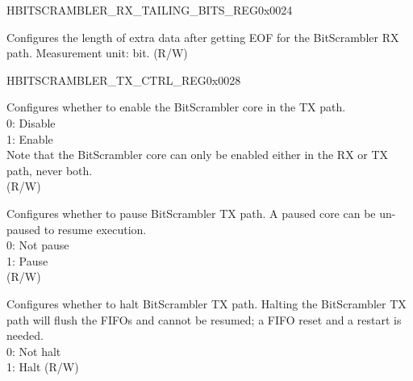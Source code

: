 \begin{register}{H}{BITSCRAMBLER\_RX\_TAILING\_BITS\_REG}{0x0024}\label{regdesc:BITSCRAMBLERRXTAILINGBITSREG}
%
%
\regnewline%
\begin{regdesc}\begin{reglist}
\label{fielddesc:BITSCRAMBLERRXTAILINGBITS}\item [BITSCRAMBLER\_RX\_TAILING\_BITS] Configures the length of extra data after getting EOF for the BitScrambler RX path. Measurement unit: bit. (R/W)
\end{reglist}\end{regdesc}
\end{register}


\begin{register}{H}{BITSCRAMBLER\_TX\_CTRL\_REG}{0x0028}\label{regdesc:BITSCRAMBLERTXCTRLREG}
%
%
%
%
%
%
%
%
%
%
\regnewline%
\begin{regdesc}\begin{reglist}
\label{fielddesc:BITSCRAMBLERTXENA}\item [BITSCRAMBLER\_TX\_ENA] 
Configures whether to enable the BitScrambler core in the TX path.  \\
0: Disable\\
1: Enable\\
Note that the BitScrambler core can only be enabled either in the RX or TX path, never both.\\
(R/W)
\label{fielddesc:BITSCRAMBLERTXPAUSE}\item [BITSCRAMBLER\_TX\_PAUSE] Configures whether to pause BitScrambler TX path. A paused core can be un-paused to resume execution. \\
0: Not pause\\
1: Pause\\
(R/W)
\label{fielddesc:BITSCRAMBLERTXHALT}\item [BITSCRAMBLER\_TX\_HALT] Configures whether to halt BitScrambler TX path. Halting the BitScrambler TX path will flush the FIFOs and cannot be resumed; a FIFO reset and a restart is needed. \\0: Not halt\\1: Halt (R/W)

\end{reglist}
\end{regdesc}
\end{register}
